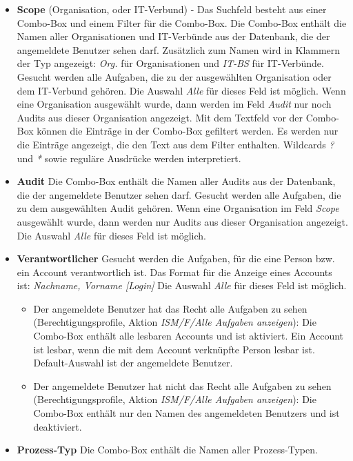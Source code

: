 \documentclass[a4paper,10pt]{book}
\begin{document}
\begin{itemize}
 \item \textbf{Scope} (Organisation, oder IT-Verbund) - Das Suchfeld besteht aus
 einer Combo-Box und einem Filter für die Combo-Box. Die Combo-Box enthält die
 Namen aller Organisationen und IT-Verbünde aus der Datenbank, die der
 angemeldete Benutzer sehen darf. Zusätzlich zum Namen wird in Klammern der Typ
 angezeigt: \textit{Org.} für Organisationen und \textit{IT-BS} für IT-Verbünde.
 Gesucht werden alle Aufgaben, die zu der ausgewählten Organisation oder dem
 IT-Verbund gehören. Die Auswahl \textit{Alle} für dieses Feld ist möglich. Wenn
 eine Organisation ausgewählt wurde, dann werden im Feld \textit{Audit} nur noch
 Audits aus dieser Organisation angezeigt. Mit dem Textfeld vor der Combo-Box
 können die Einträge in der Combo-Box gefiltert werden. Es werden nur die
 Einträge angezeigt, die den Text aus dem Filter enthalten. Wildcards \textit{?}
 und \textit{*} sowie reguläre Ausdrücke werden interpretiert.
 \item \textbf{Audit} Die Combo-Box enthält die Namen aller Audits aus der
 Datenbank, die der angemeldete Benutzer sehen darf. Gesucht werden alle
 Aufgaben, die zu dem ausgewählten Audit gehören. Wenn eine Organisation im Feld
 \textit{Scope} ausgewählt wurde, dann werden nur Audits aus dieser Organisation
 angezeigt. Die Auswahl \textit{Alle} für dieses Feld ist möglich.
 \item \textbf{Verantwortlicher} Gesucht werden die Aufgaben, für die eine
 Person bzw. ein Account verantwortlich ist. Das Format für die Anzeige eines
 Accounts ist: \textit{Nachname, Vorname [Login]} Die Auswahl \textit{Alle} für
 dieses Feld ist möglich.
 \begin{itemize}
 \item Der angemeldete Benutzer hat das Recht alle Aufgaben zu sehen
 (Berechtigungsprofile, Aktion \textit{ISM/F/Alle Aufgaben anzeigen}): Die
 Combo-Box enthält alle lesbaren Accounts und ist aktiviert. Ein Account ist
 lesbar, wenn die mit dem Account verknüpfte Person lesbar ist. Default-Auswahl
 ist der angemeldete Benutzer.
 \item Der angemeldete Benutzer hat nicht das Recht alle Aufgaben zu sehen
 (Berechtigungsprofile, Aktion \textit{ISM/F/Alle Aufgaben anzeigen}): Die
 Combo-Box enthält nur den Namen des angemeldeten Benutzers und ist deaktiviert.
 \end{itemize}
 \item \textbf{Prozess-Typ} Die Combo-Box enthält die Namen aller Prozess-Typen.

\end{itemize}
\end{document}

